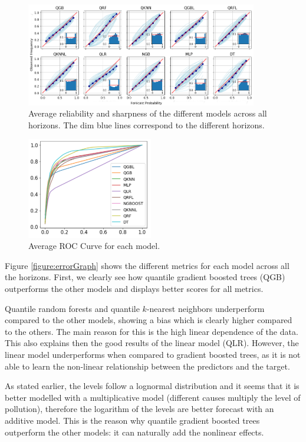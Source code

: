 \documentclass[a4paper,3p,sort&compress]{elsarticle}
\begin{document}
\begin{figure}
  \centering
  \includegraphics[width=0.9\textwidth]{reliability_sharpness}
  \caption{\label{figure:rel_sharp}Average reliability and sharpness
    of the different models across all horizons. The dim blue lines
    correspond to the different horizons. }
\end{figure}

\begin{figure}
  \centering
  \includegraphics[width=0.49\textwidth]{average_roc}
  \caption{\label{figure:average_roc}Average ROC Curve for each 
  model. }
\end{figure}

Figure \ref{figure:errorGraph} shows the different metrics for each
model across all the horizons. First, we clearly see how 
quantile gradient
boosted trees (QGB) outperforms the other models and displays better scores
for all metrics.

Quantile random forests and quantile $k$-nearest
neighbors underperform compared to the other models, showing a bias
which is clearly higher compared to the others.  The main reason for
this is the high linear dependence of the data. This also explains
then the good results of the linear model (QLR).  However, the linear
model underperforms when compared to gradient boosted trees, as it is
not able to learn the non-linear relationship between the predictors
and the target.

As stated earlier, the \no levels follow a lognormal
distribution and it seems that it is better modelled with a
multiplicative model (different causes multiply the level of
pollution), therefore the logarithm of the \no levels
are better forecast with an additive model. 
This is the reason why
quantile gradient boosted trees outperform 
the other models: it can naturally
add the nonlinear effects.
\end{document}
